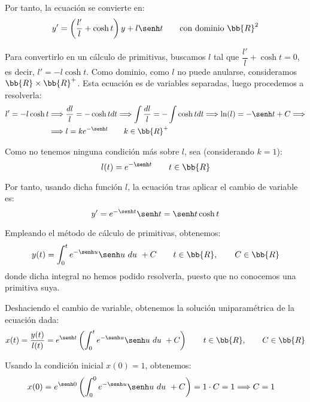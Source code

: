 \begin{ejercicio}
\begin{enumerate}
        Por tanto, la ecuación se convierte en:
        \begin{equation*}
            y' = \left(\dfrac{l'}{l} +\cosh t\right)y + l\senh t\qquad \text{con dominio }\bb{R}^2
        \end{equation*}

        Para convertirlo en un cálculo de primitivas, buscamos $l$ tal que $\dfrac{l'}{l} +\cosh t = 0$, es decir, $l' = -l\cosh t$. Como dominio, como $l$ no puede anularse, consideramos $\bb{R}\times \bb{R}^+$.
        Esta ecuación es de variables separadas, luego procedemos a resolverla:
        \begin{align*}
            l'=-l\cosh t &\Longrightarrow \dfrac{dl}{l} = -\cosh t dt \Longrightarrow \int \dfrac{dl}{l} = -\int \cosh t dt \Longrightarrow \ln(l) = -\senh t + C \Longrightarrow\\&\Longrightarrow l =  ke^{-\senh t} \qquad k\in \bb{R}^+
        \end{align*}

        Como no tenemos ninguna condición más sobre $l$, sea (considerando $k=1$):
        \begin{equation*}
            l(t) = e^{-\senh t} \qquad t\in \bb{R}
        \end{equation*}

        Por tanto, usando dicha función $l$, la ecuación tras aplicar el cambio de variable es:
        \begin{equation*}
            y' = e^{-\senh t}\senh t = \senh t\cosh t
        \end{equation*}

        Empleando el método de cálculo de primitivas, obtenemos:
        \begin{equation*}
            y(t) = \int_0^t e^{-\senh u}\senh u~du~+ C \qquad t\in \bb{R}, \qquad C\in \bb{R}
        \end{equation*}
        donde dicha integral no hemos podido resolverla, puesto que no conocemos una primitiva suya.

        Deshaciendo el cambio de variable, obtenemos la solución uniparamétrica de la ecuación dada:
        \begin{equation*}
            x(t) = \dfrac{y(t)}{l(t)} = e^{\senh t}\left(\int_0^t e^{-\senh u}\senh u~du~+ C\right) \qquad t\in \bb{R}, \qquad C\in \bb{R}
        \end{equation*}

        Usando la condición inicial $x(0)=1$, obtenemos:
        \begin{align*}
            x(0) &= e^{\senh 0}\left(\int_0^0 e^{-\senh u}\senh u~du~+ C\right) = 1\cdot C = 1 \Longrightarrow C=1
        \end{align*}


\end{enumerate}
\end{ejercicio}
